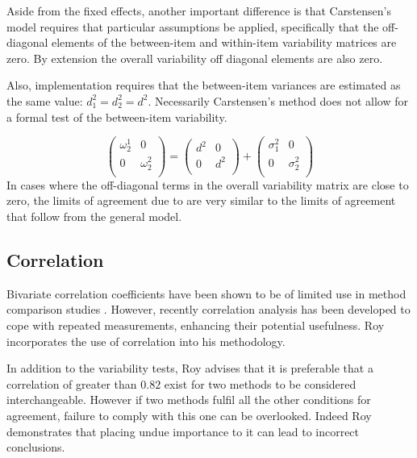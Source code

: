 \documentclass[12pt, a4paper]{report}
\theoremstyle{plain}
\theoremstyle{definition}
\theoremstyle{remark}
\begin{document}


Aside from the fixed effects, another important difference is that Carstensen's model requires that particular assumptions be applied, specifically that the off-diagonal elements of the between-item
and within-item variability matrices are zero. By extension the
overall variability off diagonal elements are also zero.




Also, implementation requires that the between-item variances are
estimated as the same value: $d^2_1 = d^2_2 = d^2$. Necessarily
Carstensen's method does not allow for a formal test of the
between-item variability.

\[\left(\begin{array}{cc}
\omega^1_2  & 0 \\
0 & \omega^2_2 \\
\end{array}  \right)
=  \left(
\begin{array}{cc}
d^2  & 0 \\
0 & d^2 \\
\end{array} \right)+
\left(
\begin{array}{cc}
\sigma^2_1  & 0 \\
0 & \sigma^2_2 \\
\end{array}\right)
\]
In cases where the off-diagonal terms in the overall variability
matrix are close to zero, the limits of agreement due to \citet{BXC2008} are very similar to the limits of agreement that follow from the general model.











\subsection{Correlation}	
Bivariate correlation coefficients have been shown to be of
limited use in method comparison studies \citep{BA86}. However,
recently correlation analysis has been developed to cope with
repeated measurements, enhancing their potential usefulness. Roy
incorporates the use of correlation into his methodology.


In addition to the variability tests, Roy advises that it is preferable that a correlation of greater than $0.82$ exist for two methods to be considered interchangeable. However if two methods fulfil all the other conditions for agreement, failure to comply with this one can be overlooked. Indeed Roy demonstrates that placing undue importance to it can lead to incorrect conclusions. 
\end{document}
